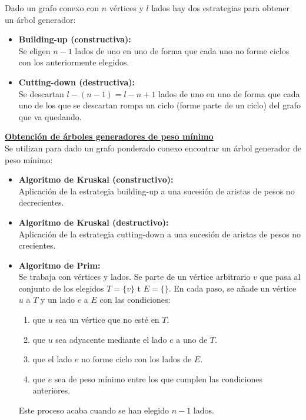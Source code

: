 Dado un grafo conexo con $n$ vértices y $l$ lados hay dos estrategias para obtener un árbol generador:
\begin{itemize}
\item\textbf{Building-up (constructiva):} \\
Se eligen $n-1$ lados de uno en uno de forma que cada uno no forme ciclos con los anteriormente elegidos.
\item\textbf{Cutting-down (destructiva):} \\
Se descartan $l-(n-1) =l-n+ 1$ lados de uno en uno de forma que cada uno de los que se descartan rompa un ciclo (forme parte de un ciclo) del grafo que va quedando.
\end{itemize}
\textbf{\underline{Obtención de árboles generadores de peso mínimo}} \\

Se utilizan para dado un grafo ponderado conexo encontrar un árbol generador de peso mínimo:
\begin{itemize}
    \item\textbf{Algoritmo de Kruskal (constructivo):} \\
    Aplicación de la estrategia building-up a una sucesión de aristas de pesos no decrecientes.
    \item\textbf{Algoritmo de Kruskal (destructivo):} \\
    Aplicación de la estrategia cutting-down a una sucesión de aristas de pesos no crecientes.
    \item\textbf{Algoritmo de Prim:} \\
    Se trabaja con vértices y lados. Se parte de un vértice arbitrario $v$ que pasa al conjunto de los elegidos $T = \{v\}$ t $E=\{\}$. En cada paso, se añade un vértice $u$ a $T$ y un lado $e$ a $E$ con las condiciones:
    \begin{enumerate}
        \item que $u$ sea un vértice que no esté en $T$.
        \item  que $u$ sea adyacente mediante el lado $e$ a uno de $T$.
        \item que el lado $e$ no forme ciclo con los lados de $E$.
        \item que $e$ sea de peso mínimo entre los que cumplen las condiciones anteriores.
    \end{enumerate}
    Este proceso acaba cuando se han elegido $n-1$ lados.
\end{itemize}

